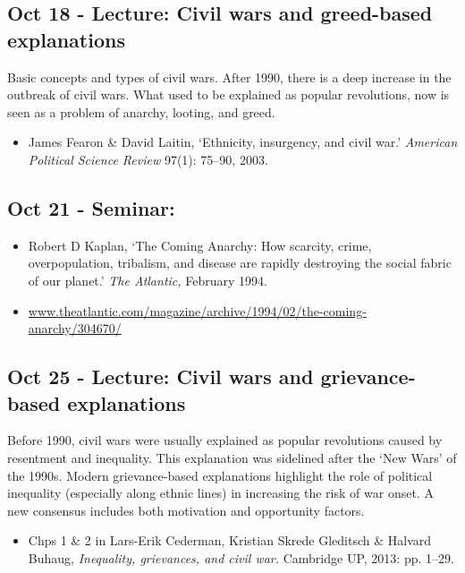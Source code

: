 \documentclass[12pt, a4paper]{article}
\begin{document}
\subsection*{Oct 18 - Lecture: Civil wars and greed-based explanations}

Basic concepts and types of civil wars. After 1990, there is a deep increase in the outbreak of civil wars. What used to be explained as popular revolutions, now is seen as a problem of anarchy, looting, and greed.

\begin{itemize}
\setlength\itemsep{0pt}
\item James Fearon \& David Laitin, `Ethnicity, insurgency, and civil war.' \textit{American Political Science Review} 97(1): 75--90, 2003.
\end{itemize}

\subsection*{Oct 21 - Seminar:}

\begin{itemize}
\setlength\itemsep{-5pt}
\item Robert D Kaplan, `The Coming Anarchy: How scarcity, crime, overpopulation, tribalism, and disease are rapidly destroying the social fabric of our planet.' \textit{The Atlantic,} February 1994.
\item[] \href{https://www.theatlantic.com/magazine/archive/1994/02/the-coming-anarchy/304670/}{www.theatlantic.com/magazine/archive/1994/02/the-coming-anarchy/304670/}
\end{itemize}

\subsection*{Oct 25 - Lecture: Civil wars and grievance-based explanations}

Before 1990, civil wars were usually explained as popular revolutions caused by resentment and inequality. This explanation was sidelined after the `New Wars' of the 1990s. Modern grievance-based explanations highlight the role of political inequality (especially along ethnic lines) in increasing the risk of war onset. A new consensus includes both motivation and opportunity factors.

\begin{itemize}
\setlength\itemsep{0pt}
\item Chps 1 \& 2 in Lars-Erik Cederman, Kristian Skrede Gleditsch \& Halvard Buhaug, \textit{Inequality, grievances, and civil war.} Cambridge UP, 2013: pp. 1--29.
\end{itemize}
\end{document}
